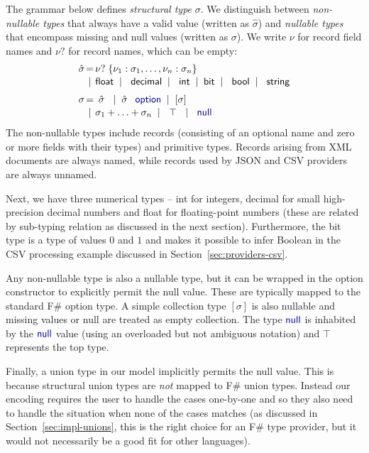 \documentclass[preprint]{sigplanconf}
\newcommand{\kvd}[1]{\textnormal{\textcolor{kvdclr}{\sffamily #1}}}
\newcommand{\ident}[1]{\textnormal{\sffamily #1}}
\newcommand{\lsep}[0]{\;\; | \;\;}
\newcommand{\narrow}[1]{\hspace{-0.85em} #1 \hspace{-0.85em}}
\begin{document}
The grammar below defines \emph{structural type} $\sigma$. We distinguish between \emph{non-nullable types}
that always have a valid value (written as $\hat{\sigma}$) and \emph{nullable types} that encompass missing 
and \kvd{null} values (written as $\sigma$). We write $\nu$ for record field names and $\nu?$
for record names, which can be empty:
%
\begin{equation*}
\begin{array}{rcl}
 \hat{\sigma} &\narrow{=}& \nu?\; \{ \nu_1 : \sigma_1, \ldots, \nu_n : \sigma_n \} \\[0.1em]
                &\narrow{|}& \ident{float} \lsep \ident{decimal} \lsep \ident{int} \lsep \ident{bit} \lsep \ident{bool} \lsep \ident{string} 
 \\[0.6em] 
       \sigma &\narrow{=}& ~\hat{\sigma}~ \lsep \hat{\sigma}\;\,\kvd{option} \lsep [\sigma] \\[0.1em]
              &\narrow{|}& \sigma_1 + \ldots + \sigma_n \lsep ~\top~ \lsep \kvd{null}
\end{array}
\end{equation*}
%
The non-nullable types include records (consisting of an optional name and zero or more fields with
their types) and primitive types. Records arising from XML documents are always named, while records
used by JSON and CSV providers are always unnamed. 

Next, we have three numerical types -- \ident{int} for integers, \ident{decimal} for small high-precision 
decimal numbers and \ident{float} for floating-point numbers (these are related by sub-typing relation as
discussed in the next section). Furthermore, the \ident{bit} type is a type of values $0$ and $1$ and 
makes it possible to infer Boolean in the CSV processing example discussed in Section~\ref{sec:providers-csv}.

Any non-nullable type is also a nullable type, but it can be wrapped in the \kvd{option}
constructor to explicitly permit the \kvd{null} value. These are typically mapped to the standard F\# option 
type. A simple collection type $[\sigma]$ is also nullable and missing values or \kvd{null} are treated as 
empty collection. The type $\kvd{null}$ is inhabited by the $\kvd{null}$ value (using an overloaded but not
ambiguous notation) and $\top$ represents the top type.

Finally, a union type in our model implicitly permits the \kvd{null} value. This is because structural union 
types are \emph{not} mapped to F\# union types. Instead our encoding requires the user to handle the 
cases one-by-one and so they also need to handle the situation when none of the cases matches (as discussed
in Section~\ref{sec:impl-unions}, this is the right choice for an F\# type provider, but it would not 
necessarily be a good fit for other languages).
\end{document}
